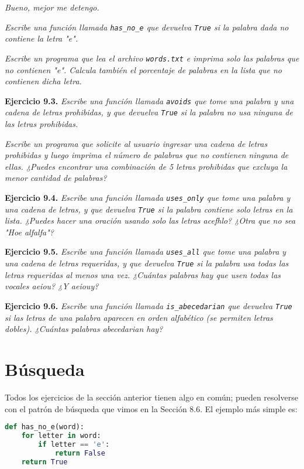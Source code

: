 \textit{Bueno, mejor me detengo.}

\textit{Escribe una función llamada \texttt{has\_no\_e} que devuelva \texttt{True} si la palabra dada no contiene la letra "e".}

\textit{Escribe un programa que lea el archivo \texttt{words.txt} e imprima solo las palabras que no contienen "e". Calcula también el porcentaje de palabras en la lista que no contienen dicha letra.}

\textbf{Ejercicio 9.3.} \textit{Escribe una función llamada \texttt{avoids} que tome una palabra y una cadena de letras prohibidas, y que devuelva \texttt{True} si la palabra no usa ninguna de las letras prohibidas.}

\textit{Escribe un programa que solicite al usuario ingresar una cadena de letras prohibidas y luego imprima el número de palabras que no contienen ninguna de ellas. ¿Puedes encontrar una combinación de 5 letras prohibidas que excluya la menor cantidad de palabras?}

\textbf{Ejercicio 9.4.} \textit{Escribe una función llamada \texttt{uses\_only} que tome una palabra y una cadena de letras, y que devuelva \texttt{True} si la palabra contiene solo letras en la lista. ¿Puedes hacer una oración usando solo las letras acefhlo? ¿Otra que no sea "Hoe alfalfa"?}

\textbf{Ejercicio 9.5.} \textit{Escribe una función llamada \texttt{uses\_all} que tome una palabra y una cadena de letras requeridas, y que devuelva \texttt{True} si la palabra usa todas las letras requeridas al menos una vez. ¿Cuántas palabras hay que usen todas las vocales aeiou? ¿Y aeiouy?}

\textbf{Ejercicio 9.6.} \textit{Escribe una función llamada \texttt{is\_abecedarian} que devuelva \texttt{True} si las letras de una palabra aparecen en orden alfabético (se permiten letras dobles). ¿Cuántas palabras abecedarian hay?}

\section{Búsqueda}

Todos los ejercicios de la sección anterior tienen algo en común; pueden resolverse con el patrón de búsqueda que vimos en la Sección 8.6. El ejemplo más simple es:

\begin{lstlisting}[language=Python]
def has_no_e(word):
    for letter in word:
        if letter == 'e':
            return False
    return True
\end{lstlisting}

